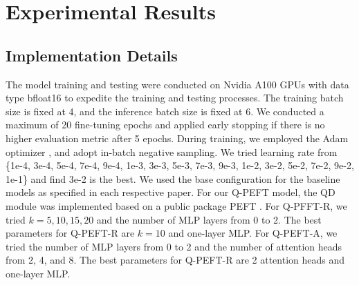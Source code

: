 \documentclass[sigconf,natbib=true,anonymous=false]{acmart}
\begin{document}
\section{Experimental Results}


\subsection{Implementation Details}

The model training and testing were conducted on Nvidia A100 GPUs with data type bfloat16 \cite{DBLP:journals/corr/abs-1905-12322} to expedite the training and testing processes. The training batch size is fixed at 4, and the inference batch size is fixed at 6. We conducted a maximum of 20 fine-tuning epochs and applied early stopping if there is no higher evaluation metric after 5 epochs. During training, we employed the Adam optimizer \cite{DBLP:journals/corr/KingmaB14}, and adopt in-batch negative sampling. We tried learning rate from \{1e-4, 3e-4, 5e-4, 7e-4, 9e-4, 1e-3, 3e-3, 5e-3, 7e-3, 9e-3, 1e-2, 3e-2, 5e-2, 7e-2, 9e-2, 1e-1\} and find 3e-2 is the best. We used the base configuration for the baseline models as specified in each respective paper. For our Q-PEFT model, the QD module was implemented based on a public package PEFT \cite{peft}. For Q-PFFT-R, we tried $k=5, 10, 15, 20$ and the number of MLP layers from 0 to 2. The best parameters for Q-PEFT-R are $k=10$ and one-layer MLP. For Q-PEFT-A, we tried the number of MLP layers from 0 to 2 and the number of attention heads from 2, 4, and 8. The best parameters for Q-PEFT-R are 2 attention heads and one-layer MLP.
\end{document}
